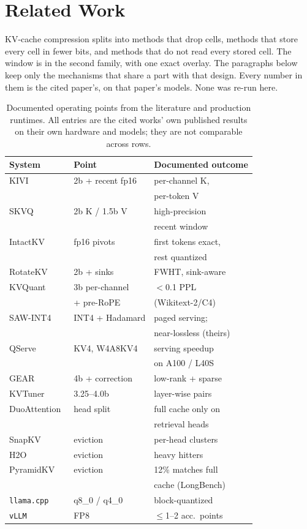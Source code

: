 \documentclass[10pt,twocolumn]{article}
\begin{document}
\section{Related Work}\label{sec:related}

KV-cache compression splits into methods that drop cells, methods that store every cell in fewer bits, and methods that do not read every stored cell. The window is in the second family, with one exact overlay. The paragraphs below keep only the mechanisms that share a part with that design. Every number in them is the cited paper's, on that paper's models. None was re-run here.

\begin{table}[t]
\centering
\footnotesize
\begin{tabular}{@{}lll@{}}
\toprule
\textbf{System} & \textbf{Point} & \textbf{Documented outcome} \\
\midrule
KIVI~\cite{kivi} & 2b + recent fp16 & per-channel K, \\
& & per-token V \\
SKVQ~\cite{skvq} & 2b K / 1.5b V & high-precision \\
& & recent window \\
IntactKV~\cite{intactkv} & fp16 pivots & first tokens exact, \\
& & rest quantized \\
RotateKV~\cite{rotatekv} & 2b + sinks & FWHT, sink-aware \\
KVQuant~\cite{kvquant} & 3b per-channel & $<$0.1 PPL \\
& + pre-RoPE & (Wikitext-2/C4) \\
SAW-INT4~\cite{sawint4} & INT4 + Hadamard & paged serving; \\
& & near-lossless (theirs) \\
QServe~\cite{qserve} & KV4, W4A8KV4 & serving speedup \\
& & on A100 / L40S \\
GEAR~\cite{gear} & 4b + correction & low-rank + sparse \\
KVTuner~\cite{kvtuner} & 3.25--4.0b & layer-wise pairs \\
DuoAttention~\cite{duoattn} & head split & full cache only on \\
& & retrieval heads \\
SnapKV~\cite{snapkv} & eviction & per-head clusters \\
H2O~\cite{h2o} & eviction & heavy hitters \\
PyramidKV~\cite{pyramidkv} & eviction & 12\% matches full \\
& & cache (LongBench) \\
\texttt{llama.cpp}~\cite{llama-cpp} & q8\_0 / q4\_0 & block-quantized \\
\texttt{vLLM}~\cite{vllm-fp8} & FP8 & $\leq$1--2 acc.\ points \\
\bottomrule
\end{tabular}
\caption{Documented operating points from the literature and production
runtimes. All entries are the cited works' own published results on their
own hardware and models; they are not comparable across rows.}
\label{tab:survey}
\end{table}
\end{document}
